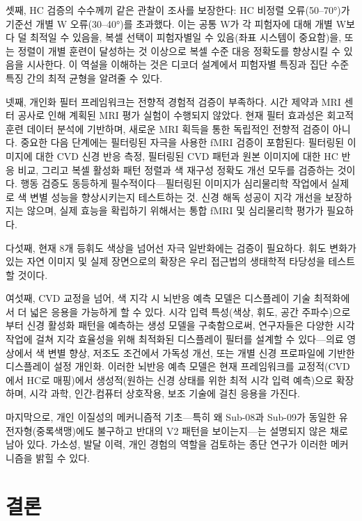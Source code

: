 \documentclass[12pt,a4paper]{article}
\begin{document}
셋째, HC 검증의 수수께끼 같은 관찰이 조사를 보장한다: HC 비정렬 오류(50--70°)가 기준선 개별 W 오류(30--40°)를 초과했다. 이는 공통 W가 각 피험자에 대해 개별 W보다 덜 최적일 수 있음을, 복셀 선택이 피험자별일 수 있음(좌표 시스템이 중요함)을, 또는 정렬이 개별 훈련이 달성하는 것 이상으로 복셀 수준 대응 정확도를 향상시킬 수 있음을 시사한다. 이 역설을 이해하는 것은 디코더 설계에서 피험자별 특징과 집단 수준 특징 간의 최적 균형을 알려줄 수 있다.

넷째, 개인화 필터 프레임워크는 전향적 경험적 검증이 부족하다. 시간 제약과 MRI 센터 공사로 인해 계획된 MRI 평가 실험이 수행되지 않았다. 현재 필터 효과성은 회고적 훈련 데이터 분석에 기반하며, 새로운 MRI 획득을 통한 독립적인 전향적 검증이 아니다. 중요한 다음 단계에는 필터링된 자극을 사용한 fMRI 검증이 포함된다: 필터링된 이미지에 대한 CVD 신경 반응 측정, 필터링된 CVD 패턴과 원본 이미지에 대한 HC 반응 비교, 그리고 복셀 활성화 패턴 정렬과 색 재구성 정확도 개선 모두를 검증하는 것이다. 행동 검증도 동등하게 필수적이다—필터링된 이미지가 심리물리학 작업에서 실제로 색 변별 성능을 향상시키는지 테스트하는 것. 신경 해독 성공이 지각 개선을 보장하지는 않으며, 실제 효능을 확립하기 위해서는 통합 fMRI 및 심리물리학 평가가 필요하다.

다섯째, 현재 8개 등휘도 색상을 넘어선 자극 일반화에는 검증이 필요하다. 휘도 변화가 있는 자연 이미지 및 실제 장면으로의 확장은 우리 접근법의 생태학적 타당성을 테스트할 것이다.

여섯째, CVD 교정을 넘어, 색 지각 시 뇌반응 예측 모델은 디스플레이 기술 최적화에서 더 넓은 응용을 가능하게 할 수 있다. 시각 입력 특성(색상, 휘도, 공간 주파수)으로부터 신경 활성화 패턴을 예측하는 생성 모델을 구축함으로써, 연구자들은 다양한 시각 작업에 걸쳐 지각 효율성을 위해 최적화된 디스플레이 필터를 설계할 수 있다—의료 영상에서 색 변별 향상, 저조도 조건에서 가독성 개선, 또는 개별 신경 프로파일에 기반한 디스플레이 설정 개인화. 이러한 뇌반응 예측 모델은 현재 프레임워크를 교정적(CVD에서 HC로 매핑)에서 생성적(원하는 신경 상태를 위한 최적 시각 입력 예측)으로 확장하며, 시각 과학, 인간-컴퓨터 상호작용, 보조 기술에 걸친 응용을 가진다.

마지막으로, 개인 이질성의 메커니즘적 기초—특히 왜 Sub-08과 Sub-09가 동일한 유전자형(중록색맹)에도 불구하고 반대의 V2 패턴을 보이는지—는 설명되지 않은 채로 남아 있다. 가소성, 발달 이력, 개인 경험의 역할을 검토하는 종단 연구가 이러한 메커니즘을 밝힐 수 있다.

\section{결론}
\end{document}
